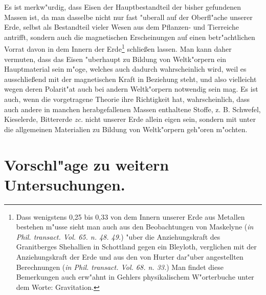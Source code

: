 \documentclass[a4paper, 11pt, oneside, polutonikogreek, german]{article}
\begin{document}
Es ist merkw"urdig, dass Eisen der Hauptbestandteil der bisher gefundenen Massen ist, da man dasselbe nicht nur fast "uberall auf der Oberfl"ache unserer Erde, selbst als Bestandteil vieler Wesen aus dem Pflanzen- und Tierreiche antrifft, sondern auch die magnetischen Erscheinungen auf einen betr"achtlichen Vorrat davon in dem Innern der Erde\footnote{Dass wenigstens 0,25 bis 0,33 von dem Innern unserer Erde aus Metallen bestehen m"usse sieht man auch aus den Beobachtungen von Maskelyne (\emph{in Phil. transact. Vol. 65. n. 48. 49.}) "uber die Anziehungskraft des Granitberges Shehallien in Schottland gegen ein Bleyloth, verglichen mit der Anziehungskraft der Erde und aus den von Hurter dar"uber angestellten Berechnungen (\emph{in Phil. transact. Vol. 68. n. 33.}) Man findet diese Bemerkungen auch erw"ahnt in Gehlers physikalischem W"orterbuche unter dem Worte: Gravitation.} schließen lassen. Man kann daher vermuten, dass das Eisen "uberhaupt zu Bildung von Weltk"orpern ein Hauptmaterial sein m"oge, welches auch dadurch wahrscheinlich wird, weil es ausschließend mit der magnetischen Kraft in Beziehung steht, und also vielleicht wegen deren Polarit"at auch bei andern Weltk"orpern notwendig sein mag. Es ist auch, wenn die vorgetragene Theorie ihre Richtigkeit hat, wahrscheinlich, dass auch andere in manchen herabgefallenen Massen enthaltene Stoffe, z. B. Schwefel, Kieselerde, Bittererde \emph{zc.} nicht unserer Erde allein eigen sein, sondern mit unter die allgemeinen Materialien zu Bildung von Weltk"orpern geh"oren m"ochten.
\clearpage
\section{Vorschl"age zu weitern Untersuchungen.}
\end{document}
